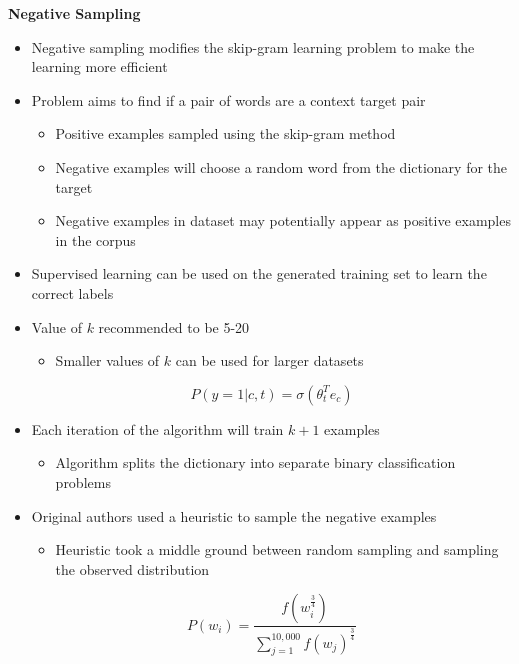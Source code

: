 \documentclass[12pt, letterpaper]{article}
\begin{document}
    \vspace{5mm}
    \textbf{Negative Sampling}
    \begin{itemize}
        \item Negative sampling modifies the skip-gram learning problem to make the learning more efficient
        \item Problem aims to find if a pair of words are a context target pair
        \begin{itemize}
            \item Positive examples sampled using the skip-gram method
            \item Negative examples will choose a random word from the dictionary for the target
            \item Negative examples in dataset may potentially appear as positive examples in the corpus
        \end{itemize}
        \item Supervised learning can be used on the generated training set to learn the correct labels
        \item Value of $k$ recommended to be 5-20
        \begin{itemize}
            \item Smaller values of $k$ can be used for larger datasets
        \end{itemize}
        $$P(y=1|c,t)=\sigma(\theta_t^Te_c)$$
        \item Each iteration of the algorithm will train $k+1$ examples
        \begin{itemize}
            \item Algorithm splits the dictionary into separate binary classification problems
        \end{itemize}
        \item Original authors used a heuristic to sample the negative examples
        \begin{itemize}
            \item Heuristic took a middle ground between random sampling and sampling the observed distribution
        \end{itemize}
        $$P(w_i)=\frac{f(w_i^\frac{3}{4})}{\sum_{j=1}^{10,000}f(w_j)^\frac{3}{4}}$$
    \end{itemize}
\end{document}
